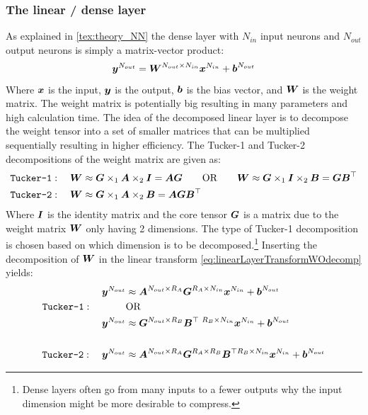 \subsubsection{The linear / dense layer}
As explained in \autoref{tex:theory_NN} the dense layer with $N_{in}$ input neurons and $N_{out}$ output neurons is simply a matrix-vector product:
\begin{equation}
    \boldsymbol{y}^{N_{out}} = \boldsymbol{W}^{N_{out}\times N_{in}}\boldsymbol{x}^{N_{in}} + \boldsymbol{b}^{N_{out}}
    \label{eq:linearLayerTransformWOdecomp}
\end{equation}
Where $\boldsymbol{x}$ is the input, $\boldsymbol{y}$ is the output, $\boldsymbol{b}$ is the bias vector, and $\boldsymbol{W}$ is the weight matrix. The weight matrix is potentially big resulting in many parameters and high calculation time. The idea of the decomposed linear layer is to decompose the weight tensor into a set of smaller matrices that can be multiplied sequentially resulting in higher efficiency. The Tucker-1 and Tucker-2 decompositions of the weight matrix are given as:
\begin{align}
\texttt{Tucker-1}&: \quad \boldsymbol{W} \approx \boldsymbol{G} \times_1 \boldsymbol{A} \times_2 \boldsymbol{I} = \boldsymbol{A}\boldsymbol{G} \qquad \text{OR} \qquad \boldsymbol{W} \approx \boldsymbol{G} \times_1 \boldsymbol{I} \times_2 \boldsymbol{B} = \boldsymbol{G}\boldsymbol{B}^\top \\
\texttt{Tucker-2}&: \quad \boldsymbol{W} \approx \boldsymbol{G} \times_1 \boldsymbol{A} \times_2 \boldsymbol{B} = \boldsymbol{A}\boldsymbol{G}\boldsymbol{B}^\top 
\end{align}
Where $\boldsymbol{I}$ is the identity matrix and the core tensor $\boldsymbol{G}$ is a matrix due to the weight matrix $\boldsymbol{W}$ only having 2 dimensions. The type of Tucker-1 decomposition is chosen based on which dimension is to be decomposed.\footnote{Dense layers often go from many inputs to a fewer outputs why the input dimension might be more desirable to compress.} Inserting the decomposition of $\boldsymbol{W}$ in the linear transform \eqref{eq:linearLayerTransformWOdecomp} yields:
\begin{align}
     \boldsymbol{y}^{N_{out}} &\approx \boldsymbol{A}^{N_{out}\times R_A} \boldsymbol{G}^{R_A\times N_{in}} \boldsymbol{x}^{N_{in}} + \boldsymbol{b}^{N_{out}} \label{eq:tucker_1_weight:prod}\\
    \texttt{Tucker-1}: \qquad \quad \ \ &\text{OR} \nonumber \\
    \boldsymbol{y}^{N_{out}} &\approx \boldsymbol{G}^{N_{out}\times R_B} \boldsymbol{B}^{\top \  R_B\times N_{in}}\boldsymbol{x}^{N_{in}} + \boldsymbol{b}^{N_{out}} \\
    &\quad \nonumber \\
    \texttt{Tucker-2}: \quad \boldsymbol{y}^{N_{out}} &\approx \boldsymbol{A}^{N_{out}\times R_A} \boldsymbol{G}^{R_A\times R_B} \boldsymbol{B}^{\top  R_B\times N_{in}}\boldsymbol{x}^{N_{in}} + \boldsymbol{b}^{N_{out}} \label{eq:tucker_2_weight:prod}
\end{align}
